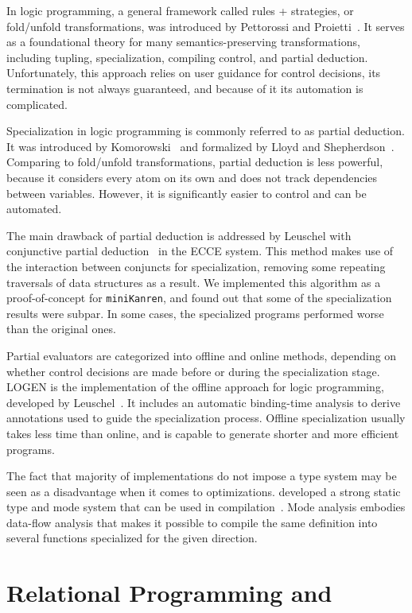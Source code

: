 \documentclass[crop=false]{standalone}
\begin{document}
In logic programming, a general framework called rules + strategies, or fold/unfold transformations, was introduced by Pettorossi and Proietti~\cite{pettorossi1996rules,pettorossi1994transformation}. 
It serves as a foundational theory for many semantics-preserving transformations, including tupling, specialization, compiling control, and partial deduction. 
Unfortunately, this approach relies on user guidance for control decisions, its termination is not always guaranteed, and because of it its automation is complicated. 

Specialization in logic programming is commonly referred to as partial deduction. 
It was introduced by Komorowski~\cite{komorowski1982partial} and formalized by Lloyd and Shepherdson~\cite{lloyd1991partial}. 
Comparing to fold/unfold transformations, partial deduction is less powerful, because it considers every atom on its own and does not track dependencies between variables. 
However, it is significantly easier to control and can be automated. 

The main drawback of partial deduction is addressed by Leuschel with conjunctive partial deduction~\cite{de1999conjunctive} in the ECCE system. 
This method makes use of the interaction between conjuncts for specialization, removing some repeating traversals of data structures as a result. 
We implemented this algorithm as a proof-of-concept for \texttt{miniKanren}, and found out that some of the specialization results were subpar.
In some cases, the specialized programs performed worse than the original ones. 

Partial evaluators are categorized into offline and online methods, depending on whether control decisions are made before or during the specialization stage. 
LOGEN is the implementation of the offline approach for logic programming, developed by Leuschel~\cite{leuschel2004offline}. 
It includes an automatic binding-time analysis to derive annotations used to guide the specialization process. 
Offline specialization usually takes less time than online, and is capable to generate shorter and more efficient programs. 

The fact that majority of \prolog implementations do not impose a type system may be seen as a disadvantage when it comes to optimizations. 
\merc developed a strong static type and mode system that can be used in compilation~\cite{overton2002constraint,overton2003precise}. 
Mode analysis embodies data-flow analysis that makes it possible to compile the same definition into several functions specialized for the given direction. 

\section{Relational Programming and \mk}
\end{document}
